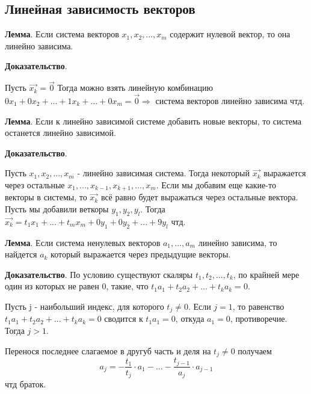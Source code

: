 \documentclass[a4paper]{article}
\begin{document}
\newpage \begin{center}\begin{Large}\end{Large}\end{center}
\subsection*{Линейная зависимость векторов}
\begin{htheorem}
\textbf{Лемма}. Если система векторов $x_1, x_2, ..., x_m$ содержит нулевой вектор, то она линейно зависима.
\end{htheorem}

\begin{hproof}
\textbf{Доказательство}. 

Пусть $\vec{x_k} = \vec{0}$
Тогда можно взять линейную комбинацию $0x_1 + 0x_2 + ... + 1x_k + ... + 0x_m = \vec{0} \Rightarrow$ система векторов линейно зависима чтд.

\end{hproof}


\begin{htheorem}
\textbf{Лемма}. Если к линейно зависимой системе добавить новые векторы, то система останется линейно зависимой.
\end{htheorem}

\begin{hproof}
\textbf{Доказательство}. 

Пусть  $x_1, x_2, ..., x_m$ - линейно зависимая система. Тогда некоторый $\vec{x_k}$ выражается через остальные $x_1, ..., x_{k-1}, x_{k+1}, ..., x_m$. Если мы добавим еще какие-то векторы в системы, то $\vec{x_k}$ всё равно будет выражаться через остальные вектора. Пусть мы добавили веткоры $y_1, y_2, y_l$. Тогда $\vec{x_k} = t_1x_1 + ... + t_mx_m + 0y_1 +0y_2 + ... + 9y_l$ чтд.
\end{hproof}

\begin{htheorem}
\textbf{Лемма}. Если система ненулевых векторов $a_1, ..., a_m$ линейно зависима, то найдется $a_k$ который выражается через предыдущие векторы.
\end{htheorem}

\begin{hproof}
\textbf{Доказательство}. По условию существуют скаляры $t_1, t_2, ..., t_k$, по крайней мере один из которых не равен 0, такие, что $t_1a_1 + t_2a_2 + ... + t_ka_k = 0$.

Пусть j - наибольший индекс, для которого $t_j \neq 0$. Если $j=1$, то равенство  $t_1a_1 + t_2a_2 + ... + t_ka_k = 0$ сводится к $t_1a_1 = 0$, откуда $a_1 = 0$, противоречие. Тогда $j>1$.

Перенося последнее слагаемое в другуб часть и деля на $t_j \neq 0$ получаем \begin{equation}
\displaystyle a_j = -\frac{t_1}{t_j}\cdot a_1 - ... - \frac{t_{j-1}}{a_j} \cdot a_{j-1}
\end{equation}
чтд браток.
\end{hproof}
\end{document}
